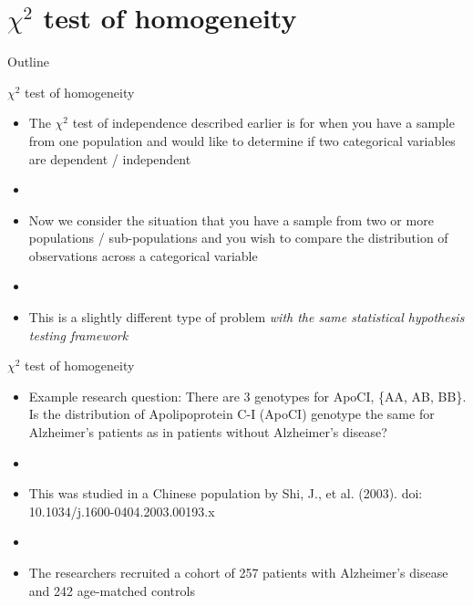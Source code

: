 \documentclass[xcolor=dvipsnames]{beamer}
\begin{document}
\section{$\chi^2$ test of homogeneity}
\begin{frame}{Outline}
\tableofcontents[currentsection,subsectionstyle=show/shaded/hide]
\end{frame}

\begin{frame}{$\chi^2$ test of homogeneity}
	\begin{itemize}
		\item The $\chi^2$ test of independence described earlier is for when you have a sample from one population and would like to determine if two categorical variables are dependent / independent  \pause
		\item[]
		\item Now we consider the situation that you have a sample from two or more populations / sub-populations and you wish to compare the distribution of observations across a categorical variable  \pause
		\item[]
		\item This is a slightly different type of problem \emph{with the same statistical hypothesis testing framework}
	\end{itemize}
\end{frame}

\begin{frame}{$\chi^2$ test of homogeneity}
	\begin{itemize}
		\item Example research question: There are 3 genotypes for ApoCI, \{AA, AB, BB\}. Is the distribution of Apolipoprotein C-I (ApoCI) genotype the same for Alzheimer's patients as in patients without Alzheimer's disease?   \pause
		\item[]
		\item This was studied in a Chinese population by Shi, J., et al. (2003). doi: 10.1034/j.1600-0404.2003.00193.x  \pause
		\item[]
		\item The researchers recruited a cohort of 257 patients with Alzheimer's disease and 242 age-matched controls
	\end{itemize}
\end{frame}
\end{document}
